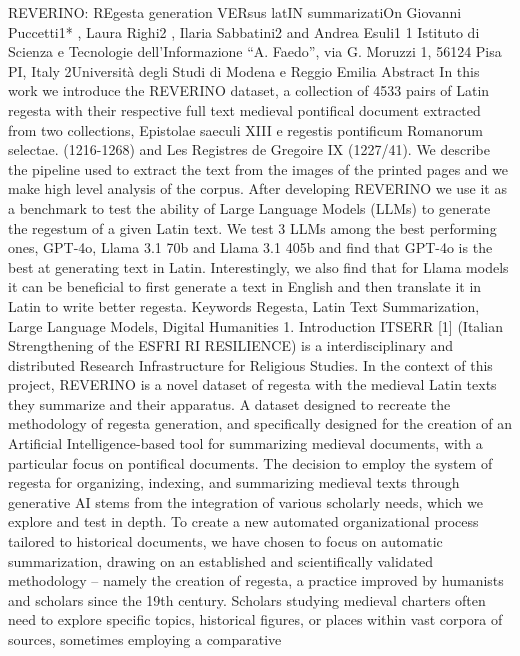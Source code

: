 {\fontsize{0.001pt}{0.000pt}\selectfont 
REVERINO: REgesta generation VERsus latIN
summarizatiOn
Giovanni Puccetti1*
, Laura Righi2
, Ilaria Sabbatini2
and Andrea Esuli1
1
Istituto di Scienza e Tecnologie dell’Informazione “A. Faedo”, via G. Moruzzi 1, 56124 Pisa PI, Italy
2Università degli Studi di Modena e Reggio Emilia
Abstract
In this work we introduce the REVERINO dataset, a collection of 4533 pairs of Latin regesta with their respective
full text medieval pontifical document extracted from two collections, Epistolae saeculi XIII e regestis pontificum
Romanorum selectae. (1216-1268) and Les Registres de Gregoire IX (1227/41). We describe the pipeline used to
extract the text from the images of the printed pages and we make high level analysis of the corpus.
After developing REVERINO we use it as a benchmark to test the ability of Large Language Models (LLMs) to
generate the regestum of a given Latin text. We test 3 LLMs among the best performing ones, GPT-4o, Llama 3.1
70b and Llama 3.1 405b and find that GPT-4o is the best at generating text in Latin. Interestingly, we also find
that for Llama models it can be beneficial to first generate a text in English and then translate it in Latin to write
better regesta.
Keywords
Regesta, Latin Text Summarization, Large Language Models, Digital Humanities
1. Introduction
ITSERR [1] (Italian Strengthening of the ESFRI RI RESILIENCE) is a interdisciplinary and distributed
Research Infrastructure for Religious Studies. In the context of this project, REVERINO is a novel dataset
of regesta with the medieval Latin texts they summarize and their apparatus. A dataset designed to
recreate the methodology of regesta generation, and specifically designed for the creation of an Artificial
Intelligence-based tool for summarizing medieval documents, with a particular focus on pontifical
documents. The decision to employ the system of regesta for organizing, indexing, and summarizing
medieval texts through generative AI stems from the integration of various scholarly needs, which
we explore and test in depth. To create a new automated organizational process tailored to historical
documents, we have chosen to focus on automatic summarization, drawing on an established and
scientifically validated methodology – namely the creation of regesta, a practice improved by humanists
and scholars since the 19th century. Scholars studying medieval charters often need to explore specific
topics, historical figures, or places within vast corpora of sources, sometimes employing a comparative
}
